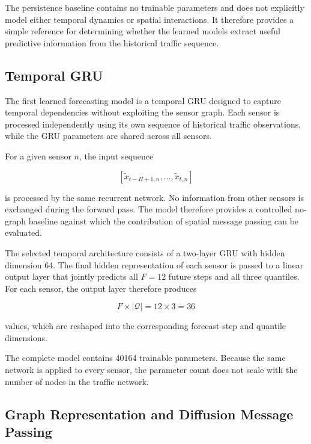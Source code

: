 The persistence baseline contains no trainable parameters and does not
explicitly model either temporal dynamics or spatial interactions. It
therefore provides a simple reference for determining whether the learned
models extract useful predictive information from the historical traffic
sequence.


\subsection{Temporal GRU}
\label{subsec:gru}

The first learned forecasting model is a temporal GRU designed to capture
temporal dependencies without exploiting the sensor graph. Each sensor is
processed independently using its own sequence of historical traffic
observations, while the GRU parameters are shared across all sensors.

For a given sensor $n$, the input sequence

\begin{equation}
    \left[
        \tilde{x}_{t-H+1,n},
        \ldots,
        \tilde{x}_{t,n}
    \right]
\end{equation}

is processed by the same recurrent network. No information from other
sensors is exchanged during the forward pass. The model therefore provides a
controlled no-graph baseline against which the contribution of spatial
message passing can be evaluated.

The selected temporal architecture consists of a two-layer GRU with hidden
dimension 64. The final hidden representation of each sensor is passed to a
linear output layer that jointly predicts all $F=12$ future steps and all
three quantiles. For each sensor, the output layer therefore produces

\begin{equation}
    F \times |\mathcal{Q}| = 12 \times 3 = 36
\end{equation}

values, which are reshaped into the corresponding forecast-step and quantile
dimensions.

The complete model contains 40164 trainable parameters. Because the same
network is applied to every sensor, the parameter count does not scale with
the number of nodes in the traffic network.


\subsection{Graph Representation and Diffusion Message Passing}
\label{subsec:graph}

